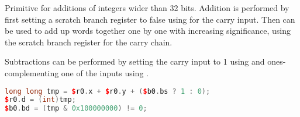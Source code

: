 \noindent Primitive for additions of integers wider than 32 bits. Addition is performed by
first setting a scratch branch register to false using  for the carry
input. Then  can be used to add up words together one by one with
increasing significance, using the scratch branch register for the carry chain.

Subtractions can be performed by setting the carry input to 1 using 
and ones-complementing one of the inputs using .

\begin{lstlisting}[numbers=none, basicstyle=\ttfamily\footnotesize, language=C++]
long long tmp = $r0.x + $r0.y + ($b0.bs ? 1 : 0);
$r0.d = (int)tmp;
$b0.bd = (tmp & 0x100000000) != 0;
\end{lstlisting}


